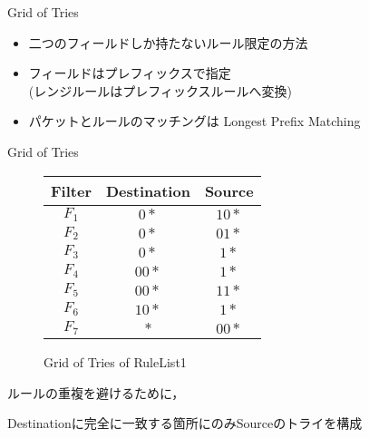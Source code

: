 \documentclass[12pt,dvipdfmx,mathserif,uplatex,aspectratio=32]{beamer}
\makeatletter
\newcommand{\tblcaption}[1]{\def\@captype{table}\caption{#1}}
\makeatother
\begin{document}
\begin{frame}{Grid of Tries}

 \begin{itemize}
  \item 二つのフィールドしか持たないルール限定の方法 \vspace{3mm}
  \item フィールドはプレフィックスで指定 \\ (レンジルールはプレフィックスルールへ変換) \vspace{3mm}
  \item パケットとルールのマッチングは Longest Prefix Matching
 \end{itemize}

\end{frame}

\begin{frame}{Grid of Tries}

\begin{figure}[h]
 \def\@captype{table}
 \begin{minipage}[t]{.3\textwidth}
  {\scriptsize
  {\centering
  \begin{tabular}{c|c|c} 
   Filter   & Destination & Source \\ \hline
   $F_{1} $ & $0*$        & $10*$   \\ \hline
   $F_{2} $ & $0*$        & $01*$   \\ \hline
   $F_{3} $ & $0*$        & $1*$   \\ \hline
   $F_{4} $ & $00*$       & $1*$   \\ \hline
   $F_{5} $ & $00*$       & $11*$   \\ \hline
   $F_{6} $ & $10*$       & $1*$   \\ \hline
   $F_{7} $ & $*$         & $00*$   
  \end{tabular}
  \tblcaption{RuleList1}

  }
  }
  \end{minipage}
  \hfill
  \begin{minipage}[c]{.6\textwidth}
   \vspace{8mm}
   \scalebox{0.45}{}
   \vspace{-6mm}
   \caption{Grid of Tries of RuleList1}
  \end{minipage}
\end{figure}

\vspace{3mm}

ルールの重複を避けるために，\par Destinationに完全に一致する箇所にのみSourceのトライを構成

\end{frame}
\end{document}
